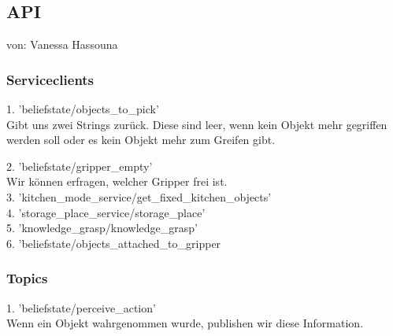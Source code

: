 \documentclass{suturo}
\makeatletter
\newcommand{\chapterauthor}[1]{%
  {\parindent0pt\vspace*{-27pt}%
  \linespread{0}\small\begin{flushright}von: #1\end{flushright}%
  \par\nobreak\vspace*{0pt}}
  \@afterheading%
}
\makeatother
\begin{document}
\begin{figure}[!htb]
\end{figure}

\subsection{API}
\chapterauthor{Vanessa Hassouna}
\subsubsection{Serviceclients}

1. 'beliefstate/objects\_to\_pick'\\
Gibt uns zwei Strings zurück. Diese sind leer, wenn kein Objekt mehr gegriffen werden soll oder es kein Objekt mehr zum Greifen gibt.

2. 'beliefstate/gripper\_empty'\\
Wir können erfragen, welcher Gripper frei ist.\\

3. 'kitchen\_mode\_service/get\_fixed\_kitchen\_objects'\\

4. 'storage\_place\_service/storage\_place'\\

5. 'knowledge\_grasp/knowledge\_grasp'\\

6. 'beliefstate/objects\_attached\_to\_gripper\\

\subsubsection{Topics}
1. 'beliefstate/perceive\_action'\\
Wenn ein Objekt wahrgenommen wurde, publishen wir diese Information.
\end{document}
